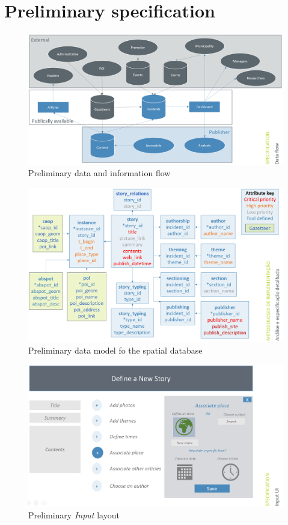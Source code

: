 \newpage
\section{Preliminary specification} \label{appendix:organization}
\begin{figure}[H]
	\centering
	\includegraphics[width=.9\linewidth]{images/information_flow.png}
	\caption{Preliminary data and information flow}
	\label{fig:info_flow}
\end{figure}

\begin{figure}[H]
	\centering
	\includegraphics[width=.9\linewidth]{images/data_model.png}
	\caption{Preliminary data model fo the spatial database}
	\label{fig:data_model}
\end{figure}

\begin{figure}[H]
	\centering
	\includegraphics[width=.9\linewidth]{images/input_layout.png}
	\caption{Preliminary \textit{Input} layout}
	\label{fig:input_ui}
\end{figure}

